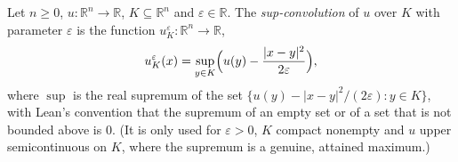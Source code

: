 \begin{definition}
Let $n\ge0$, $u:\mathbb R^n\to\mathbb R$, $K\subseteq\mathbb R^n$ and $\varepsilon\in\mathbb R$. The \emph{sup-convolution} of $u$ over $K$ with parameter $\varepsilon$ is the function $u^{\varepsilon}_K:\mathbb R^n\to\mathbb R$,
\[
u^{\varepsilon}_K(x)=\sup_{y\in K}\Bigl(u(y)-\frac{|x-y|^2}{2\varepsilon}\Bigr),
\]
where $\sup$ is the real supremum of the set $\{u(y)-|x-y|^2/(2\varepsilon):y\in K\}$, with Lean's convention that the supremum of an empty set or of a set that is not bounded above is $0$. (It is only used for $\varepsilon>0$, $K$ compact nonempty and $u$ upper semicontinuous on $K$, where the supremum is a genuine, attained maximum.)
\end{definition}
